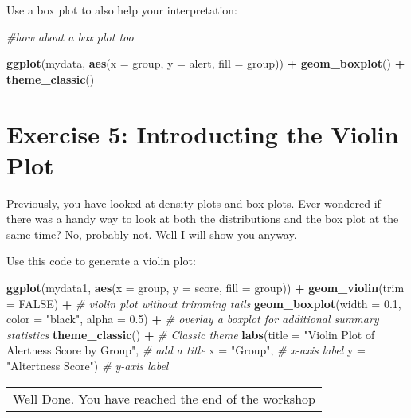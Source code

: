 \documentclass[
]{book}
\newenvironment{Shaded}{\begin{snugshade}}{\end{snugshade}}
\newcommand{\AttributeTok}[1]{\textcolor[rgb]{0.13,0.29,0.53}{#1}}
\newcommand{\CommentTok}[1]{\textcolor[rgb]{0.56,0.35,0.01}{\textit{#1}}}
\newcommand{\ConstantTok}[1]{\textcolor[rgb]{0.56,0.35,0.01}{#1}}
\newcommand{\FloatTok}[1]{\textcolor[rgb]{0.00,0.00,0.81}{#1}}
\newcommand{\FunctionTok}[1]{\textcolor[rgb]{0.13,0.29,0.53}{\textbf{#1}}}
\newcommand{\NormalTok}[1]{#1}
\newcommand{\SpecialCharTok}[1]{\textcolor[rgb]{0.81,0.36,0.00}{\textbf{#1}}}
\newcommand{\StringTok}[1]{\textcolor[rgb]{0.31,0.60,0.02}{#1}}
\let\oldsection\section
\renewcommand{\section}{\needspace{5\baselineskip}\oldsection}
\begin{document}
Use a box plot to also help your interpretation:

\begin{Shaded}
\begin{Highlighting}[]
\CommentTok{\#how about a box plot too}

\FunctionTok{ggplot}\NormalTok{(mydata, }\FunctionTok{aes}\NormalTok{(}\AttributeTok{x =}\NormalTok{ group, }\AttributeTok{y =}\NormalTok{ alert, }\AttributeTok{fill =}\NormalTok{ group)) }\SpecialCharTok{+}
  \FunctionTok{geom\_boxplot}\NormalTok{() }\SpecialCharTok{+}
  \FunctionTok{theme\_classic}\NormalTok{()}
\end{Highlighting}
\end{Shaded}

\section{Exercise 5: Introducting the Violin Plot}\label{exercise-5-introducting-the-violin-plot}

Previously, you have looked at density plots and box plots. Ever wondered if there was a handy way to look at both the distributions and the box plot at the same time? No, probably not. Well I will show you anyway.

Use this code to generate a violin plot:

\begin{Shaded}
\begin{Highlighting}[]
\FunctionTok{ggplot}\NormalTok{(mydata1, }\FunctionTok{aes}\NormalTok{(}\AttributeTok{x =}\NormalTok{ group, }\AttributeTok{y =}\NormalTok{ score, }\AttributeTok{fill =}\NormalTok{ group)) }\SpecialCharTok{+}
  \FunctionTok{geom\_violin}\NormalTok{(}\AttributeTok{trim =} \ConstantTok{FALSE}\NormalTok{) }\SpecialCharTok{+}  \CommentTok{\# violin plot without trimming tails}
  \FunctionTok{geom\_boxplot}\NormalTok{(}\AttributeTok{width =} \FloatTok{0.1}\NormalTok{, }\AttributeTok{color =} \StringTok{"black"}\NormalTok{, }\AttributeTok{alpha =} \FloatTok{0.5}\NormalTok{) }\SpecialCharTok{+}  \CommentTok{\# overlay a boxplot for additional summary statistics}
  \FunctionTok{theme\_classic}\NormalTok{() }\SpecialCharTok{+}  \CommentTok{\# Classic theme}
  \FunctionTok{labs}\NormalTok{(}\AttributeTok{title =} \StringTok{"Violin Plot of Alertness Score by Group"}\NormalTok{,  }\CommentTok{\# add a title}
       \AttributeTok{x =} \StringTok{"Group"}\NormalTok{,  }\CommentTok{\# x{-}axis label}
       \AttributeTok{y =} \StringTok{"Altertness Score"}\NormalTok{)  }\CommentTok{\# y{-}axis label}
\end{Highlighting}
\end{Shaded}

\begin{longtable}[]{@{}l@{}}
\toprule\noalign{}
\endhead
\bottomrule\noalign{}
\endlastfoot
Well Done. You have reached the end of the workshop \\
\end{longtable}


\end{document}
